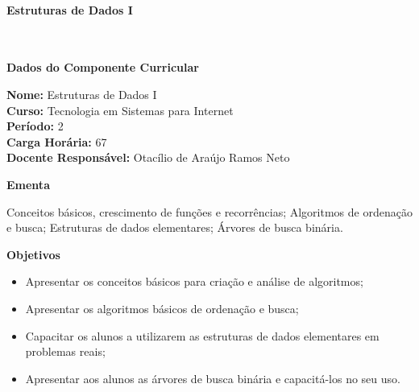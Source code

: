 \paragraph{Estruturas de Dados I} \


\begin{snugshade}\begin{center}\textbf{
	Dados do Componente Curricular
}\end{center}\end{snugshade}

\noindent 	\textbf{Nome:} Estruturas de Dados I
\\ 			\textbf{Curso:} Tecnologia em Sistemas para Internet
\\ 			\textbf{Período:} \unit{2}{\degree}
\\ 			\textbf{Carga Horária:} \unit{67}{\hour}
\\ 			\textbf{Docente Responsável:} Otacílio de Araújo Ramos Neto


\begin{snugshade}\begin{center}\textbf{
    Ementa
\vphantom{q}}\end{center}\end{snugshade}

\noindent
Conceitos básicos, crescimento de funções e recorrências; Algoritmos de ordenação e busca; Estruturas de dados elementares; Árvores de busca binária.

\begin{snugshade}\begin{center}\textbf{
    Objetivos
}\end{center}\end{snugshade}

\begin{itemize}

\item Apresentar os conceitos básicos para criação e análise de algoritmos;
\item Apresentar os algoritmos básicos de ordenação e busca;
\item Capacitar os alunos a utilizarem as estruturas de dados elementares em problemas reais;
\item Apresentar aos alunos as árvores de busca binária e capacitá-los no seu uso.

\end{itemize} 

